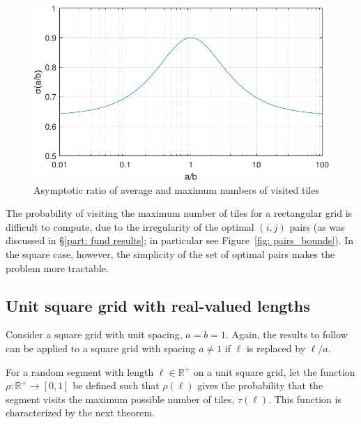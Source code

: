\documentclass[12pt, a4paper]{article}
\newcommand{\funt}{\tau} %
\newcommand{\probmax}{\rho} %
\newcommand{\len}{\ell} %
\begin{document}
\begin{figure}
\centering%
\includegraphics[width=.7\textwidth]{ratio_asympt_slopes}%
\caption{Asymptotic ratio of average and maximum numbers of visited tiles
}%
\label{fig: ratio asympt slopes}%
\end{figure}%

The probability of visiting the maximum number of tiles for a rectangular grid is difficult to compute, due to the irregularity of the optimal $(i,j)$ pairs (as was discussed in \S\ref{part: fund results}; in particular see Figure~\ref{fig: pairs_bounds}). In the square case, however, the simplicity of the set of optimal pairs makes the problem more tractable.


\subsection{Unit square grid with real-valued lengths}
\label{part: probmax: unit square grid, real lengths}

Consider a square grid with unit spacing, $a=b=1$. Again, the results to follow can be applied to a square grid with spacing $a \neq 1$ if $\len$ is replaced by $\len/a$.

For a random segment with length $\len \in \mathbb R^+$ on a unit square grid, let the function $\probmax: \mathbb R^+ \to [0,1]$ be defined such that $\probmax(\len)$ gives the probability that the segment visits the maximum possible number of tiles, $\funt(\len)$. This function is characterized by the next theorem.
\end{document}
